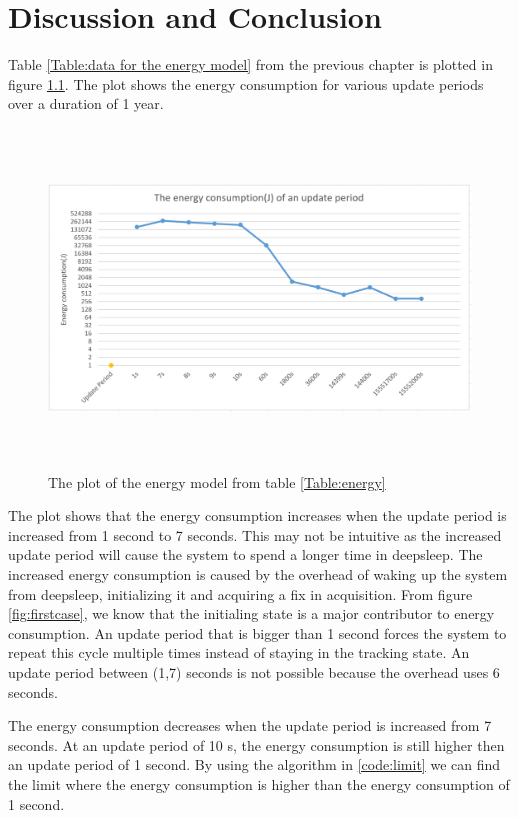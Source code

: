 \chapter{Discussion and Conclusion}
Table \ref{Table:data for the energy model} from the previous chapter is plotted in figure \ref{fig:energyconsumption}. The plot shows the energy consumption for various update periods over a duration of 1 year.

\begin{figure}[H]
\centering
\includegraphics[height=9.0cm]{Project_Report/Images/energyconsumption.PNG}
\caption{The plot of the energy model from table \ref{Table:energy}}
\label{fig:energyconsumption}
\end{figure}

The plot shows that the energy consumption increases when the update period is increased from 1 second to 7 seconds. This may not be intuitive as the increased update period will cause the system to spend a longer time in deepsleep. The increased energy consumption is caused by the overhead of waking up the system from deepsleep, initializing it and acquiring a fix in acquisition. From figure \ref{fig:firstcase}, we know that the initialing state is a major contributor to energy consumption. An update period that is bigger than  1 second forces the system to repeat this cycle multiple times instead of staying in the tracking state. An update period between (1,7) seconds is not possible because the overhead uses 6 seconds.

The energy consumption decreases when the update period is increased from 7 seconds. At an update period of 10 s, the energy consumption is still higher then an update period of 1 second. By using the algorithm in \ref{code:limit} we can find the limit where the energy consumption is higher than the energy consumption of 1 second.


